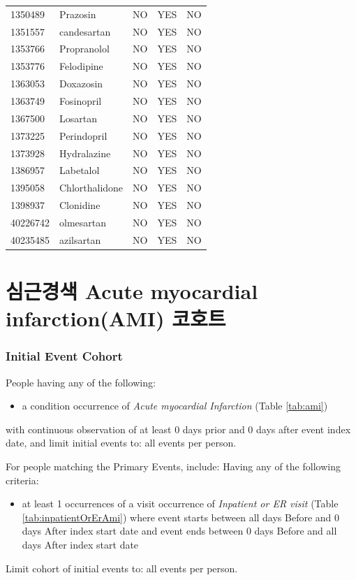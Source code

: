 \documentclass[10.5pt]{book}
\providecommand{\tightlist}{%
  \setlength{\itemsep}{0pt}\setlength{\parskip}{0pt}}
\theoremstyle{definition}
\theoremstyle{definition}
\theoremstyle{definition}
\theoremstyle{remark}
\begin{document}
\begin{longtable}[]{@{}lllll@{}}
1350489 & Prazosin & NO & YES & NO\tabularnewline
1351557 & candesartan & NO & YES & NO\tabularnewline
1353766 & Propranolol & NO & YES & NO\tabularnewline
1353776 & Felodipine & NO & YES & NO\tabularnewline
1363053 & Doxazosin & NO & YES & NO\tabularnewline
1363749 & Fosinopril & NO & YES & NO\tabularnewline
1367500 & Losartan & NO & YES & NO\tabularnewline
1373225 & Perindopril & NO & YES & NO\tabularnewline
1373928 & Hydralazine & NO & YES & NO\tabularnewline
1386957 & Labetalol & NO & YES & NO\tabularnewline
1395058 & Chlorthalidone & NO & YES & NO\tabularnewline
1398937 & Clonidine & NO & YES & NO\tabularnewline
40226742 & olmesartan & NO & YES & NO\tabularnewline
40235485 & azilsartan & NO & YES & NO\tabularnewline
\bottomrule
\end{longtable}

\section{심근경색 Acute myocardial infarction(AMI) 코호트}\label{Ami}

\subsubsection*{Initial Event Cohort}\label{initial-event-cohort-2}

People having any of the following:

\begin{itemize}
\tightlist
\item
  a condition occurrence of \emph{Acute myocardial Infarction} (Table
  \ref{tab:ami})
\end{itemize}

with continuous observation of at least 0 days prior and 0 days after
event index date, and limit initial events to: all events per person.

For people matching the Primary Events, include: Having any of the
following criteria:

\begin{itemize}
\tightlist
\item
  at least 1 occurrences of a visit occurrence of \emph{Inpatient or ER
  visit} (Table \ref{tab:inpatientOrErAmi}) where event starts between
  all days Before and 0 days After index start date and event ends
  between 0 days Before and all days After index start date
\end{itemize}

Limit cohort of initial events to: all events per person.
\end{document}
